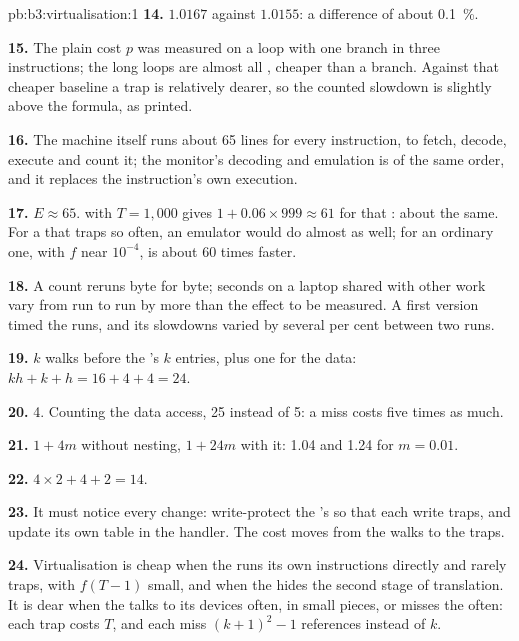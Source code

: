 \begin{solution}{pb:b3:virtualisation:1}
\textbf{14.} $1.0167$ against $1.0155$: a difference of about 0.1~\%.

\textbf{15.} The plain cost $p$ was measured on a loop with one branch in three instructions; the long loops are almost all , cheaper than a branch. Against that cheaper baseline a trap is relatively dearer, so the counted slowdown is slightly above the formula, as printed.

\textbf{16.} The machine itself runs about 65 lines for every instruction, to fetch, decode, execute and count it; the monitor's decoding and emulation is of the same order, and it replaces the instruction's own execution.

\textbf{17.} $E \approx 65$.  with $T = 1{,}000$ gives $1 + 0.06 \times 999 \approx 61$ for that : about the same. For a  that traps so often, an emulator would do almost as well; for an ordinary one, with $f$ near $10^{-4}$,  is about 60 times faster.

\textbf{18.} A count reruns byte for byte; seconds on a laptop shared with other work vary from run to run by more than the effect to be measured. A first version timed the runs, and its slowdowns varied by several per cent between two runs.

\textbf{19.} $k$  walks before the 's $k$ entries, plus one for the data: $kh + k + h = 16 + 4 + 4 = 24$.

\textbf{20.} 4. Counting the data access, 25 instead of 5: a  miss costs five times as much.

\textbf{21.} $1 + 4m$ without nesting, $1 + 24m$ with it: 1.04 and 1.24 for $m = 0.01$.

\textbf{22.} $4 \times 2 + 4 + 2 = 14$.

\textbf{23.} It must notice every change: write-protect the 's  so that each write traps, and update its own table in the handler. The cost moves from the walks to the traps.

\textbf{24.} Virtualisation is cheap when the  runs its own instructions directly and rarely traps, with $f(T - 1)$ small, and when the  hides the second stage of translation. It is dear when the  talks to its devices often, in small pieces, or misses the  often: each trap costs $T$, and each miss $(k + 1)^2 - 1$ references instead of $k$.
\end{solution}
